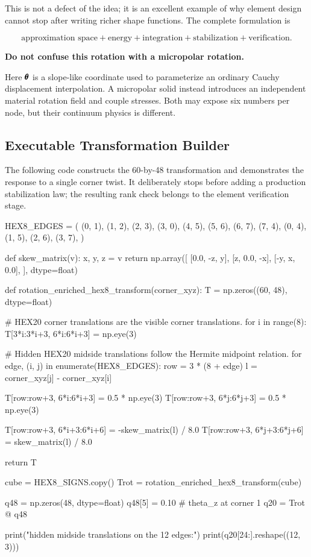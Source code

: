 This is not a defect of the idea; it is an excellent example of why element
design cannot stop after writing richer shape functions.  The complete
formulation is

\begin{equation}
    \boxed{
    \text{approximation space}
    +\text{energy}
    +\text{integration}
    +\text{stabilization}
    +\text{verification}
    }.
\end{equation}

\begin{bbox}
\textbf{Do not confuse this rotation with a micropolar rotation.}

Here $\pmb{\theta}$ is a slope-like coordinate used to parameterize an ordinary
Cauchy displacement interpolation.  A micropolar solid instead introduces an
independent material rotation field and couple stresses.  Both may expose six
numbers per node, but their continuum physics is different.
\end{bbox}

\subsection{Executable Transformation Builder}

The following code constructs the 60-by-48 transformation and demonstrates the
response to a single corner twist.  It deliberately stops before adding a
production stabilization law; the resulting rank check belongs to the element
verification stage.

\begin{python}
HEX8_EDGES = (
    (0, 1), (1, 2), (2, 3), (3, 0),
    (4, 5), (5, 6), (6, 7), (7, 4),
    (0, 4), (1, 5), (2, 6), (3, 7),
)


def skew_matrix(v):
    x, y, z = v
    return np.array([
        [0.0, -z,   y],
        [z,    0.0, -x],
        [-y,   x,   0.0],
    ], dtype=float)


def rotation_enriched_hex8_transform(corner_xyz):
    T = np.zeros((60, 48), dtype=float)

    # HEX20 corner translations are the visible corner translations.
    for i in range(8):
        T[3*i:3*i+3, 6*i:6*i+3] = np.eye(3)

    # Hidden HEX20 midside translations follow the Hermite midpoint relation.
    for edge, (i, j) in enumerate(HEX8_EDGES):
        row = 3 * (8 + edge)
        l = corner_xyz[j] - corner_xyz[i]

        T[row:row+3, 6*i:6*i+3] = 0.5 * np.eye(3)
        T[row:row+3, 6*j:6*j+3] = 0.5 * np.eye(3)

        T[row:row+3, 6*i+3:6*i+6] = -skew_matrix(l) / 8.0
        T[row:row+3, 6*j+3:6*j+6] =  skew_matrix(l) / 8.0

    return T


cube = HEX8_SIGNS.copy()
Trot = rotation_enriched_hex8_transform(cube)

q48 = np.zeros(48, dtype=float)
q48[5] = 0.10              # theta_z at corner 1
q20 = Trot @ q48

print("hidden midside translations on the 12 edges:")
print(q20[24:].reshape((12, 3)))
\end{python}

